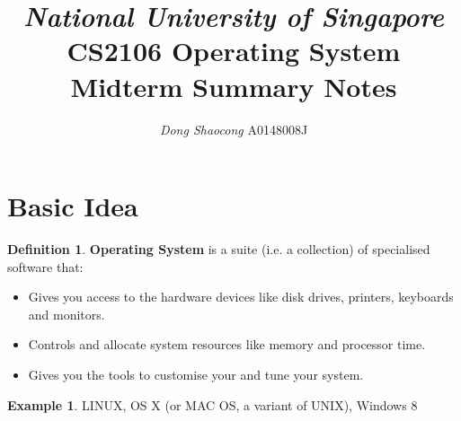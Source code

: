 \documentclass[12pt,a4paper]{article}
\title{\textsl{National University of Singapore} \\ \textbf{CS2106 Operating System}\\ Midterm Summary Notes}
\author{\textit{Dong Shaocong} A0148008J}
\theoremstyle{definition}
\newtheorem{definition}{Definition}[section]
\newtheorem{example}{Example}[section]
\newenvironment{myitemize}
{ \begin{itemize}
    \setlength{\itemsep}{5pt}
    \setlength{\parskip}{0pt}
    \setlength{\parsep}{0pt}     }
{ \end{itemize}                  }
\begin{document}
\maketitle

\section{Basic Idea}
\begin{definition}{\textbf{Operating System}}
	is a suite (i.e. a collection) of specialised software that:
	\begin{myitemize}
		\item Gives you access to the hardware devices like disk drives, printers, keyboards and monitors.
		\item Controls and allocate system resources like memory and processor time.
		\item Gives you the tools to customise your and tune your system.
	\end{myitemize}
\end{definition}
\begin{example}
	LINUX, OS X (or MAC OS, a variant of UNIX), Windows 8
\end{example}
\end{document}
